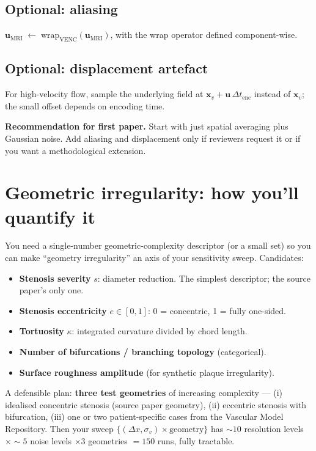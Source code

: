 \documentclass[11pt]{article}
\begin{document}
\subsection*{Optional: aliasing}
$\mathbf{u}_{\text{MRI}} \;\leftarrow\; \mathrm{wrap}_{\text{VENC}}(\mathbf{u}_{\text{MRI}})$, with the wrap operator defined component-wise.

\subsection*{Optional: displacement artefact}
For high-velocity flow, sample the underlying field at $\mathbf{x}_v + \mathbf{u}\,\Delta t_{\text{enc}}$ instead of $\mathbf{x}_v$; the small offset depends on encoding time.

\textbf{Recommendation for first paper.} Start with just spatial averaging plus Gaussian noise. Add aliasing and displacement only if reviewers request it or if you want a methodological extension.

\section{Geometric irregularity: how you'll quantify it}

You need a single-number geometric-complexity descriptor (or a small set) so you can make ``geometry irregularity'' an axis of your sensitivity sweep. Candidates:

\begin{itemize}[noitemsep]
\item \textbf{Stenosis severity} $s$: diameter reduction. The simplest descriptor; the source paper's only one.
\item \textbf{Stenosis eccentricity} $e \in [0,1]$: 0 = concentric, 1 = fully one-sided.
\item \textbf{Tortuosity} $\kappa$: integrated curvature divided by chord length.
\item \textbf{Number of bifurcations / branching topology} (categorical).
\item \textbf{Surface roughness amplitude} (for synthetic plaque irregularity).
\end{itemize}

A defensible plan: \textbf{three test geometries} of increasing complexity --- (i) idealised concentric stenosis (source paper geometry), (ii) eccentric stenosis with bifurcation, (iii) one or two patient-specific cases from the Vascular Model Repository. Then your sweep $\{(\Delta x, \sigma_v) \times \text{geometry}\}$ has $\sim 10$ resolution levels $\times \sim 5$ noise levels $\times 3$ geometries $= 150$ runs, fully tractable.
\end{document}
